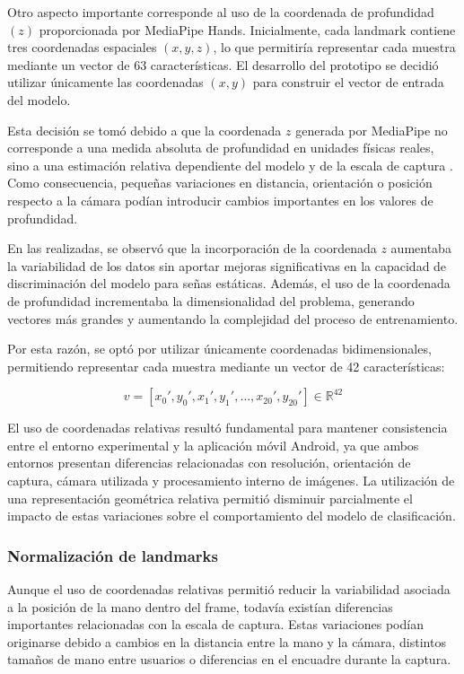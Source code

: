 	Otro aspecto importante corresponde al uso de la coordenada de profundidad
	$(z)$ proporcionada por MediaPipe Hands. Inicialmente, cada landmark contiene tres
	coordenadas espaciales $(x,y,z)$, lo que permitiría representar cada muestra
	mediante un vector de 63 características. El desarrollo del
	prototipo se decidió utilizar únicamente las coordenadas $(x,y)$ para construir el
	vector de entrada del modelo.
	
	Esta decisión se tomó debido a que la coordenada $z$ generada por MediaPipe no
	corresponde a una medida absoluta de profundidad en unidades físicas reales, sino
	a una estimación relativa dependiente del modelo y de la escala de captura
	\cite{mediapipeHandsPaper}. Como consecuencia, pequeñas variaciones en distancia,
	orientación o posición respecto a la cámara podían introducir cambios importantes
	en los valores de profundidad.
	
	En las realizadas, se observó que la incorporación de la coordenada
	$z$ aumentaba la variabilidad de los datos sin aportar mejoras significativas en
	la capacidad de discriminación del modelo para señas estáticas. Además, el uso de
	la coordenada de profundidad incrementaba la dimensionalidad del problema,
	generando vectores más grandes y aumentando la complejidad del proceso de
	entrenamiento.
	
	Por esta razón, se optó por utilizar únicamente coordenadas bidimensionales,
	permitiendo representar cada muestra mediante un vector de 42 características:
	
	\[
	v =
	[x_0',y_0',
	x_1',y_1',
	\ldots,
	x_{20}',y_{20}']
	\in \mathbb{R}^{42}
	\]
	
	El uso de coordenadas relativas resultó fundamental para mantener
	consistencia entre el entorno experimental y la aplicación móvil Android, ya que
	ambos entornos presentan diferencias relacionadas con resolución, orientación de
	captura, cámara utilizada y procesamiento interno de imágenes. La utilización de
	una representación geométrica relativa permitió disminuir parcialmente el impacto
	de estas variaciones sobre el comportamiento del modelo de clasificación.
	
	\subsubsection{Normalización de landmarks}
	
	Aunque el uso de coordenadas relativas permitió reducir la variabilidad asociada
	a la posición de la mano dentro del frame, todavía existían diferencias
	importantes relacionadas con la escala de captura. Estas variaciones podían
	originarse debido a cambios en la distancia entre la mano y la cámara, distintos
	tamaños de mano entre usuarios o diferencias en el encuadre durante la captura.
	
